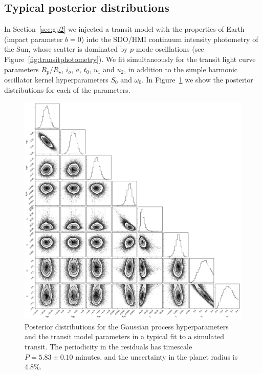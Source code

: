 \begin{subappendices}
\section{Typical posterior distributions} \label{sec:posteriors}

In Section~\ref{sec:gp2} we injected a \citet{Mandel2002} transit model with the properties of Earth (impact parameter $b=0$) into the SDO/HMI continuum intensity photometry of the Sun, whose scatter is dominated by $p$-mode oscillations (see Figure~\ref{fig:transitphotometry}). We fit simultaneously for the transit light curve parameters $R_p/R_\star$, $i_o$, $a$, $t_0$, $u_1$ and $u_2$, in addition to the simple harmonic oscillator kernel hyperparameters $S_0$ and $\omega_0$. In Figure~\ref{fig:corner} we show the posterior distributions for each of the parameters. 

\begin{figure}
    \centering
    \includegraphics[scale=0.38]{stash/corner_oot.pdf}
    \caption{Posterior distributions for the Gaussian process hyperparameters and the \citet{Mandel2002} transit model parameters in a typical fit to a simulated transit. The periodicity in the residuals has timescale $P = 5.83 \pm 0.10$ minutes, and the uncertainty in the planet radius is 4.8\%.}
    \label{fig:corner}
\end{figure}
\end{subappendices}
%
%
%
